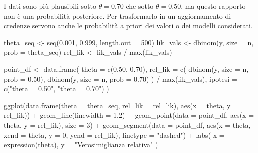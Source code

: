 \documentclass[
  italian,
  letterpaper,
  a4paper,
  11pt,
  open=any]{scrbook}
\newenvironment{Shaded}{\begin{snugshade}}{\end{snugshade}}
\newcommand{\AttributeTok}[1]{\textcolor[rgb]{0.40,0.45,0.13}{#1}}
\newcommand{\DecValTok}[1]{\textcolor[rgb]{0.68,0.00,0.00}{#1}}
\newcommand{\FloatTok}[1]{\textcolor[rgb]{0.68,0.00,0.00}{#1}}
\newcommand{\FunctionTok}[1]{\textcolor[rgb]{0.28,0.35,0.67}{#1}}
\newcommand{\NormalTok}[1]{\textcolor[rgb]{0.00,0.23,0.31}{#1}}
\newcommand{\OtherTok}[1]{\textcolor[rgb]{0.00,0.23,0.31}{#1}}
\newcommand{\SpecialCharTok}[1]{\textcolor[rgb]{0.37,0.37,0.37}{#1}}
\newcommand{\StringTok}[1]{\textcolor[rgb]{0.13,0.47,0.30}{#1}}
\theoremstyle{plain}
\theoremstyle{definition}
\theoremstyle{definition}
\theoremstyle{remark}
\begin{document}
I dati sono più plausibili sotto \(\theta=0.70\) che sotto
\(\theta=0.50\), ma questo rapporto non è una probabilità posteriore.
Per trasformarlo in un aggiornamento di credenze servono anche le
probabilità a priori dei valori o dei modelli considerati.

\begin{Shaded}
\begin{Highlighting}[]
\NormalTok{theta\_seq }\OtherTok{\textless{}{-}} \FunctionTok{seq}\NormalTok{(}\FloatTok{0.001}\NormalTok{, }\FloatTok{0.999}\NormalTok{, }\AttributeTok{length.out =} \DecValTok{500}\NormalTok{)}
\NormalTok{lik\_vals }\OtherTok{\textless{}{-}} \FunctionTok{dbinom}\NormalTok{(y, }\AttributeTok{size =}\NormalTok{ n, }\AttributeTok{prob =}\NormalTok{ theta\_seq)}
\NormalTok{rel\_lik }\OtherTok{\textless{}{-}}\NormalTok{ lik\_vals }\SpecialCharTok{/} \FunctionTok{max}\NormalTok{(lik\_vals)}

\NormalTok{point\_df }\OtherTok{\textless{}{-}} \FunctionTok{data.frame}\NormalTok{(}
  \AttributeTok{theta =} \FunctionTok{c}\NormalTok{(}\FloatTok{0.50}\NormalTok{, }\FloatTok{0.70}\NormalTok{),}
  \AttributeTok{rel\_lik =} \FunctionTok{c}\NormalTok{(}
    \FunctionTok{dbinom}\NormalTok{(y, }\AttributeTok{size =}\NormalTok{ n, }\AttributeTok{prob =} \FloatTok{0.50}\NormalTok{),}
    \FunctionTok{dbinom}\NormalTok{(y, }\AttributeTok{size =}\NormalTok{ n, }\AttributeTok{prob =} \FloatTok{0.70}\NormalTok{)}
\NormalTok{  ) }\SpecialCharTok{/} \FunctionTok{max}\NormalTok{(lik\_vals),}
  \AttributeTok{ipotesi =} \FunctionTok{c}\NormalTok{(}\StringTok{"theta = 0.50"}\NormalTok{, }\StringTok{"theta = 0.70"}\NormalTok{)}
\NormalTok{)}

\FunctionTok{ggplot}\NormalTok{(}\FunctionTok{data.frame}\NormalTok{(}\AttributeTok{theta =}\NormalTok{ theta\_seq, }\AttributeTok{rel\_lik =}\NormalTok{ rel\_lik),}
       \FunctionTok{aes}\NormalTok{(}\AttributeTok{x =}\NormalTok{ theta, }\AttributeTok{y =}\NormalTok{ rel\_lik)) }\SpecialCharTok{+}
  \FunctionTok{geom\_line}\NormalTok{(}\AttributeTok{linewidth =} \FloatTok{1.2}\NormalTok{) }\SpecialCharTok{+}
  \FunctionTok{geom\_point}\NormalTok{(}\AttributeTok{data =}\NormalTok{ point\_df, }\FunctionTok{aes}\NormalTok{(}\AttributeTok{x =}\NormalTok{ theta, }\AttributeTok{y =}\NormalTok{ rel\_lik), }\AttributeTok{size =} \DecValTok{3}\NormalTok{) }\SpecialCharTok{+}
  \FunctionTok{geom\_segment}\NormalTok{(}\AttributeTok{data =}\NormalTok{ point\_df,}
               \FunctionTok{aes}\NormalTok{(}\AttributeTok{x =}\NormalTok{ theta, }\AttributeTok{xend =}\NormalTok{ theta, }\AttributeTok{y =} \DecValTok{0}\NormalTok{, }\AttributeTok{yend =}\NormalTok{ rel\_lik),}
               \AttributeTok{linetype =} \StringTok{"dashed"}\NormalTok{) }\SpecialCharTok{+}
  \FunctionTok{labs}\NormalTok{(}
    \AttributeTok{x =} \FunctionTok{expression}\NormalTok{(theta),}
    \AttributeTok{y =} \StringTok{"Verosimiglianza relativa"}
\NormalTok{  )}
\end{Highlighting}
\end{Shaded}
\end{document}
